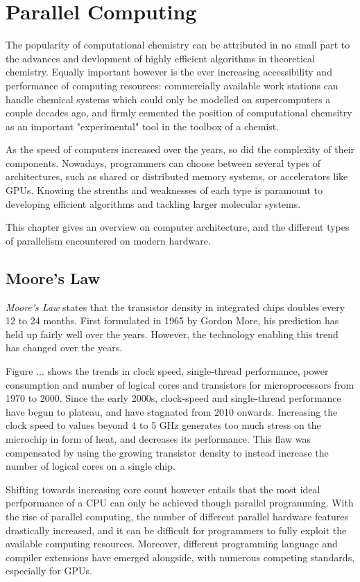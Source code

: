 \chapter{Parallel Computing}

The popularity of computational chemistry can be attributed in no small part to the advances and devlopment of highly efficient algorithms in theoretical chemistry. Equally important however is the ever increasing accessibility and performance of computing resources: commercially available work stations can handle chemical systems which could only be modelled on supercomputers a couple decades ago, and firmly cemented the position of computational chemsitry as an important "experimental" tool in the toolbox of a chemist. 

As the speed of computers increased over the years, so did the complexity of their components. Nowadays, programmers can choose between several types of architectures, such as shared or distributed memory systems, or accelerators like GPUs. Knowing the strenths and weaknesses of each type is paramount to developing efficient algorithms and tackling larger molecular systems.

This chapter gives an overview on computer architecture, and the different types of parallelism encountered on modern hardware.

\section{Moore's Law}

\emph{Moore's Law} states that the transistor density in integrated chips doubles every 12 to 24 months. First formulated in 1965 by Gordon More, his prediction has held up fairly well over the years. However, the technology enabling this trend has changed over the years.

Figure ... shows the trends in clock speed, single-thread performance, power consumption and number of logical cores and transistors for microprocessors from 1970 to 2000. Since the early 2000s, clock-speed and single-thread performance have begun to plateau, and have stagnated from 2010 onwards. Increasing the clock speed to values beyond 4 to 5 GHz generates too much stress on the microchip in form of heat, and decreases its performance. This flaw was compensated by using the growing transistor density to instead increase the number of logical cores on a single chip. 

Shifting towards increasing core count however entails that the most ideal perfpormance of a CPU can only be achieved though parallel programming. With the rise of parallel computing, the number of different parallel hardware features drastically increased, and it can be difficult for programmers to fully exploit the available computing resources. Moreover, different programming language and compiler extensions have emerged alongside, with numerous competing standards, especially for GPUs. 

